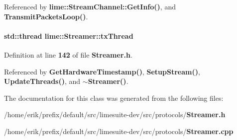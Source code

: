 Referenced by {\bf lime\+::\+Stream\+Channel\+::\+Get\+Info()}, and {\bf Transmit\+Packets\+Loop()}.

\paragraph[{tx\+Thread}]{\setlength{\rightskip}{0pt plus 5cm}std\+::thread lime\+::\+Streamer\+::tx\+Thread}\label{classlime_1_1Streamer_aa90caa658ae054c9dd389f6b09bad00a}


Definition at line {\bf 142} of file {\bf Streamer.\+h}.



Referenced by {\bf Get\+Hardware\+Timestamp()}, {\bf Setup\+Stream()}, {\bf Update\+Threads()}, and {\bf $\sim$\+Streamer()}.



The documentation for this class was generated from the following files\+:\begin{DoxyCompactItemize}
\item 
/home/erik/prefix/default/src/limesuite-\/dev/src/protocols/{\bf Streamer.\+h}\item 
/home/erik/prefix/default/src/limesuite-\/dev/src/protocols/{\bf Streamer.\+cpp}\end{DoxyCompactItemize}
